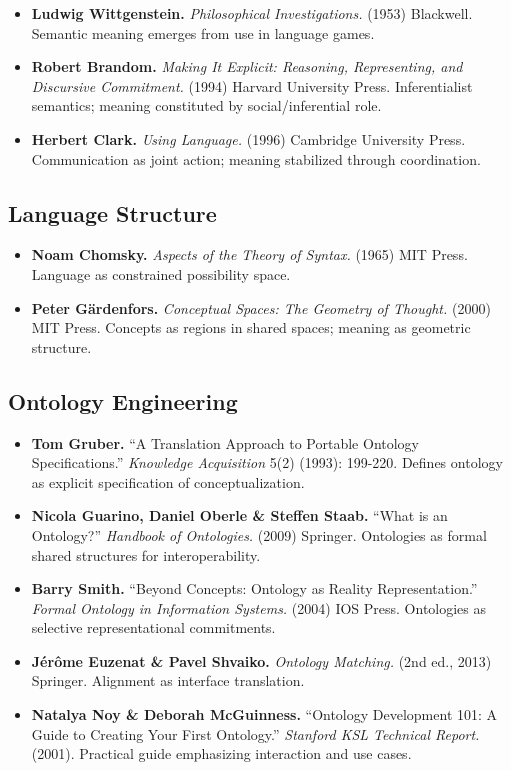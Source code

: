 \documentclass[
  openright]{book}
\begin{document}
\begin{itemize}
\item
  \textbf{Ludwig Wittgenstein.} \emph{Philosophical Investigations.}
  (1953) Blackwell. Semantic meaning emerges from use in language games.
\item
  \textbf{Robert Brandom.} \emph{Making It Explicit: Reasoning,
  Representing, and Discursive Commitment.} (1994) Harvard University
  Press. Inferentialist semantics; meaning constituted by
  social/inferential role.
\item
  \textbf{Herbert Clark.} \emph{Using Language.} (1996) Cambridge
  University Press. Communication as joint action; meaning stabilized
  through coordination.
\end{itemize}

\subsection{Language Structure}\label{language-structure}

\begin{itemize}
\item
  \textbf{Noam Chomsky.} \emph{Aspects of the Theory of Syntax.} (1965)
  MIT Press. Language as constrained possibility space.
\item
  \textbf{Peter Gärdenfors.} \emph{Conceptual Spaces: The Geometry of
  Thought.} (2000) MIT Press. Concepts as regions in shared spaces;
  meaning as geometric structure.
\end{itemize}

\subsection{Ontology Engineering}\label{ontology-engineering}

\begin{itemize}
\item
  \textbf{Tom Gruber.} ``A Translation Approach to Portable Ontology
  Specifications.'' \emph{Knowledge Acquisition} 5(2) (1993): 199-220.
  Defines ontology as explicit specification of conceptualization.
\item
  \textbf{Nicola Guarino, Daniel Oberle \& Steffen Staab.} ``What is an
  Ontology?'' \emph{Handbook of Ontologies.} (2009) Springer. Ontologies
  as formal shared structures for interoperability.
\item
  \textbf{Barry Smith.} ``Beyond Concepts: Ontology as Reality
  Representation.'' \emph{Formal Ontology in Information Systems.}
  (2004) IOS Press. Ontologies as selective representational
  commitments.
\item
  \textbf{Jérôme Euzenat \& Pavel Shvaiko.} \emph{Ontology Matching.}
  (2nd ed., 2013) Springer. Alignment as interface translation.
\item
  \textbf{Natalya Noy \& Deborah McGuinness.} ``Ontology Development
  101: A Guide to Creating Your First Ontology.'' \emph{Stanford KSL
  Technical Report.} (2001). Practical guide emphasizing interaction and
  use cases.
\end{itemize}
\end{document}
